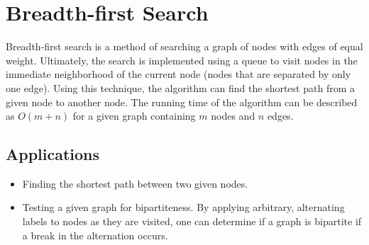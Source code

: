\section{Breadth-first Search}

Breadth-first search is a method of searching a graph of nodes with edges of equal weight.
Ultimately, the search is implemented using a queue to visit nodes in the immediate neighborhood of the current node (nodes that are separated by only one edge).
Using this technique, the algorithm can find the shortest path from a given node to another node.
The running time of the algorithm can be described as $O(m + n)$ for a given graph containing $m$ nodes and $n$ edges.

\subsection{Applications}

\begin{itemize}
	\item Finding the shortest path between two given nodes.
	\item Testing a given graph for bipartiteness.
	By applying arbitrary, alternating labels to nodes as they are visited, one can determine if a graph is bipartite if a break in the alternation occurs.
\end{itemize}
